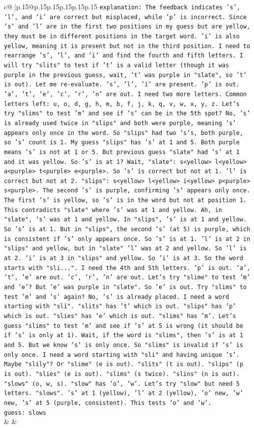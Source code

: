 \documentclass{article}
\begin{document}
{\begin{supertabular}{c@{$\;$}|p{.15\linewidth}@{}p{.15\linewidth}p{.15\linewidth}p{.15\linewidth}p{.15\linewidth}p{.15\linewidth}}
{{{                \texttt{explanation: The feedback indicates 's', 'l', and 'i' are correct but misplaced, while 'p' is incorrect. Since 's' and 'l' are in the first two positions in my guess but are yellow, they must be in different positions in the target word. 'i' is also yellow, meaning it is present but not in the third position. I need to rearrange 's', 'l', and 'i' and find the fourth and fifth letters. I will try "slits" to test if 't' is a valid letter (though it was purple in the previous guess, wait, 't' was purple in "slate", so 't' is out). Let me re{-}evaluate. 's', 'l', 'i' are present. 'p' is out. 'a', 't', 'e', 'c', 'r', 'n' are out. I need two more letters. Common letters left: u, o, d, g, h, m, b, f, j, k, q, v, w, x, y, z. Let's try "slims" to test 'm' and see if 's' can be in the 5th spot? No, 's' is already used twice in "slips" and both were purple, meaning 's' appears only once in the word. So "slips" had two 's's, both purple, so 's' count is 1. My guess "slips" has 's' at 1 and 5. Both purple means 's' is not at 1 or 5. But previous guess "slate" had 's' at 1 and it was yellow. So 's' is at 1? Wait, "slate": s<yellow> l<yellow> a<purple> t<purple> e<purple>. So 's' is correct but not at 1. 'l' is correct but not at 2. "slips": s<yellow> l<yellow> i<yellow> p<purple> s<purple>. The second 's' is purple, confirming 's' appears only once. The first 's' is yellow, so 's' is in the word but not at position 1. This contradicts "slate" where 's' was at 1 and yellow. Ah, in "slate", 's' was at 1 and yellow. In "slips", 's' is at 1 and yellow. So 's' is at 1. But in "slips", the second 's' (at 5) is purple, which is consistent if 's' only appears once. So 's' is at 1. 'l' is at 2 in "slips" and yellow, but in "slate" 'l' was at 2 and yellow. So 'l' is at 2. 'i' is at 3 in "slips" and yellow. So 'i' is at 3. So the word starts with "sli...". I need the 4th and 5th letters. 'p' is out. 'a', 't', 'e' are out. 'c', 'r', 'n' are out. Let's try "slime" to test 'm' and 'e'? But 'e' was purple in "slate". So 'e' is out. Try "slims" to test 'm' and 's' again? No, 's' is already placed. I need a word starting with "sli". "slits" has 't' which is out. "slips" has 'p' which is out. "slies" has 'e' which is out. "slims" has 'm'. Let's guess "slims" to test 'm' and see if 's' at 5 is wrong (it should be if 's' is only at 1). Wait, if the word is "slims", then 's' is at 1 and 5. But we know 's' is only once. So "slims" is invalid if 's' is only once. I need a word starting with "sli" and having unique 's'. Maybe "slily"? Or "slime" (e is out). "slits" (t is out). "slips" (p is out). "slies" (e is out). "slims" (s twice). "slins" (n is out). "slows" (o, w, s). "slow" has 'o', 'w'. Let's try "slow" but need 5 letters. "slows". 's' at 1 (yellow), 'l' at 2 (yellow), 'o' new, 'w' new, 's' at 5 (purple, consistent). This tests 'o' and 'w'.} \\
\texttt{guess: slows} \\
            }
        }
    }
    & & \\ \\


\end{supertabular}}
\end{document}
